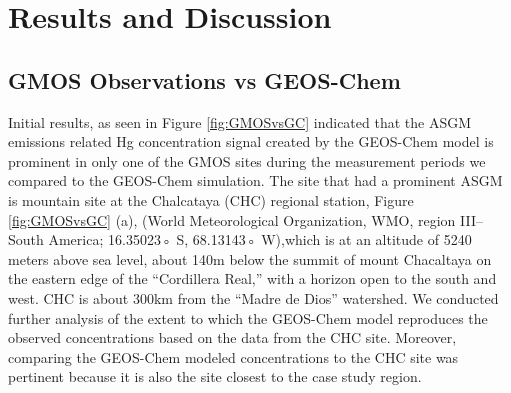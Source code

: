 \section{Results and Discussion}
\subsection{GMOS Observations vs GEOS-Chem}
\begin{flushleft}
Initial results, as seen in Figure \ref{fig:GMOSvsGC} indicated that the ASGM emissions related Hg concentration signal created by the GEOS-Chem model is prominent in only one of the GMOS sites during the measurement periods we compared to the GEOS-Chem simulation. The site that had a prominent ASGM  is mountain site at the Chalcataya (CHC) regional station, Figure \ref{fig:GMOSvsGC} (a), (World Meteorological Organization, WMO, region III-- South America; 16.35023◦ S, 68.13143◦ W),which is at an altitude of 5240 meters above sea level, about 140m below the summit of mount Chacaltaya on the eastern edge of the ``Cordillera Real,'' with a horizon open to the south and west. CHC is about 300km from the ``Madre de Dios'' watershed. We conducted further analysis of the extent to which the GEOS-Chem model reproduces the observed concentrations based on the data from the CHC site. Moreover, comparing the GEOS-Chem modeled concentrations to the CHC site was pertinent because it is also the site closest to the case study region. 
\end{flushleft}


                        




